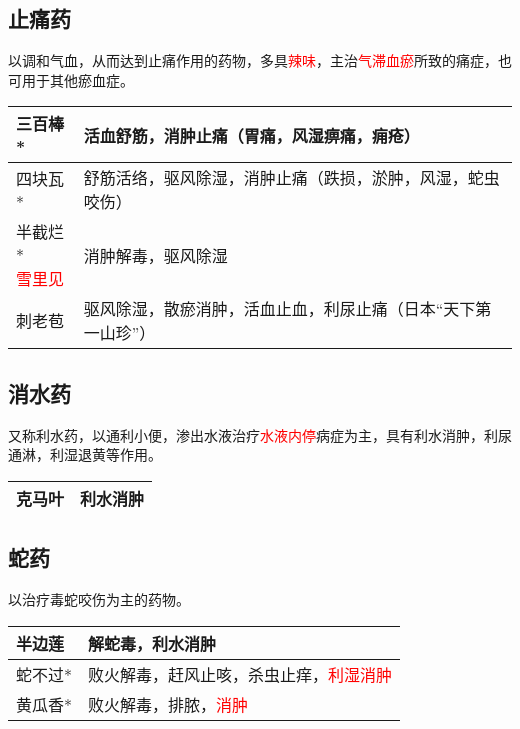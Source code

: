 \documentclass[cn,hazy,blue,12pt,normal,founder]{elegantnote}
\newcommand{\redt}[1]{\textcolor{red}{{}#1}}      %
\begin{document}
\subsection{止痛药}

以调和气血，从而达到止痛作用的药物，多具\redt{辣味}，主治\redt{气滞血瘀}所致的痛症，也可用于其他瘀血症。

\begin{table}[H]
  \begin{tabular}{|l|l|}
  \hline
  三百棒* & 活血舒筋，消肿止痛（胃痛，风湿痹痛，痈疮） \\ \hline
  四块瓦* & 舒筋活络，驱风除湿，消肿止痛（跌损，淤肿，风湿，蛇虫咬伤） \\ \hline
  \makecell[l]{半截烂* \\ \redt{雪里见}} & 消肿解毒，驱风除湿 \\ \hline
  刺老苞 & 驱风除湿，散瘀消肿，活血止血，利尿止痛（日本“天下第一山珍”） \\ \hline
  \end{tabular}
\end{table}

\subsection{消水药}

又称利水药，以通利小便，渗出水液治疗\redt{水液内停}病症为主，具有利水消肿，利尿通淋，利湿退黄等作用。

\begin{table}[H]
  \begin{tabular}{|l|l|}
  \hline
  克马叶 & 利水消肿 \\ \hline
  \end{tabular}
\end{table}

\subsection{蛇药}

以治疗毒蛇咬伤为主的药物。

\begin{table}[H]
  \begin{tabular}{|l|l|}
  \hline
  半边莲 & 解蛇毒，利水消肿 \\ \hline
  蛇不过* & 败火解毒，赶风止咳，杀虫止痒，\redt{利湿消肿}  \\ \hline
  黄瓜香* & 败火解毒，排脓，\redt{消肿} \\ \hline
  \end{tabular}
\end{table}
\end{document}
